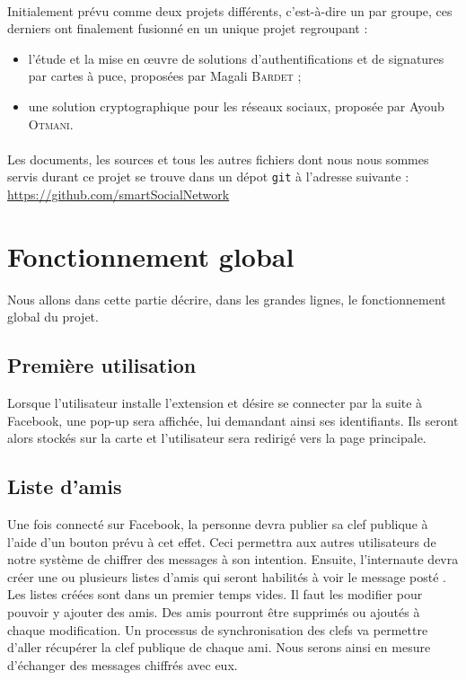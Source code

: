 \documentclass[a4paper,11pt,french]{article}
\begin{document}
\paragraph{}
Initialement prévu comme deux projets différents, c'est-à-dire un par groupe,
ces derniers ont finalement fusionné en un unique projet regroupant :
\begin{itemize}
    \item l'étude et la mise en \oe{}uvre de solutions d’authentifications et 
        de signatures par cartes à puce, proposées par Magali \textsc{Bardet} ;
    \item une solution cryptographique pour les réseaux sociaux, proposée par
	Ayoub \textsc{Otmani}.
\end{itemize}

\paragraph{}
Les documents, les sources et tous les autres fichiers dont nous nous sommes
servis durant ce projet se trouve dans un dépot \texttt{git} à l'adresse
suivante : \url{https://github.com/smartSocialNetwork}

\section{Fonctionnement global}
Nous allons dans cette partie décrire, dans les grandes lignes, le 
fonctionnement global du projet.

\subsection{Première utilisation}
Lorsque l'utilisateur installe l'extension et désire se connecter par la suite
à Facebook, une \og pop-up \fg{} sera affichée, lui demandant ainsi ses
identifiants. Ils seront alors stockés sur la carte et l'utilisateur sera
redirigé vers la page principale.

\subsection{Liste d'amis}
Une fois connecté sur Facebook, la personne devra publier sa clef publique
à l'aide d'un bouton prévu à cet effet. Ceci permettra aux autres utilisateurs
de notre système de chiffrer des messages à son intention. Ensuite, l'internaute
devra créer une ou plusieurs listes d'amis qui seront habilités à voir le
message \og posté \fg{}. Les listes créées sont dans un premier temps vides.
Il faut les modifier pour pouvoir y ajouter des amis. Des amis pourront être
supprimés ou ajoutés à chaque modification. Un processus de synchronisation
des clefs va permettre d'aller récupérer la clef publique de chaque ami. Nous
serons ainsi en mesure d'échanger des messages chiffrés avec eux.
\end{document}
